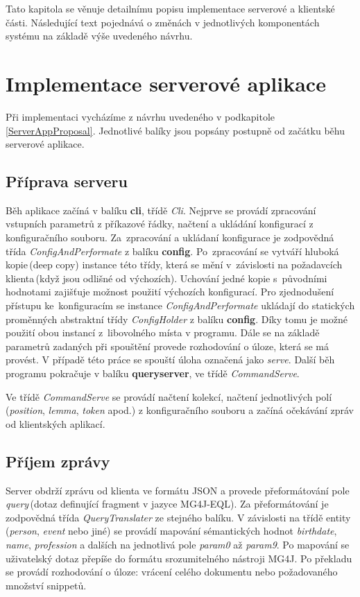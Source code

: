 Tato kapitola se věnuje detailnímu popisu implementace serverové a klientské části. Následující text pojednává o  změnách v jednotlivých komponentách systému na základě výše uvedeného návrhu.   


\section{Implementace serverové aplikace}
\label{serverSideImplem}
Při implementaci vycházíme z návrhu uvedeného v podkapitole \ref{ServerAppProposal}. Jednotlivé balíky jsou popsány postupně od začátku běhu serverové aplikace. 

\subsection*{Příprava serveru}

Běh aplikace začíná v balíku \textbf{cli}, třídě \emph{Cli}. Nejprve se provádí zpracování vstupních parametrů z příkazové řádky, načtení a ukládání konfigurací z konfiguračního souboru. Za~zpracování a ukládaní konfigurace je zodpovědná třída \emph{ConfigAndPerformate} z balíku  \textbf{config}. Po~zpracování se vytváří hluboká kopie\,(deep copy) instance této třídy, která se mění v~závislosti na požadavcích klienta\,(když jsou odlišné od výchozích). Uchování jedné kopie s~původními hodnotami zajišťuje možnost použití výchozích konfigurací. Pro zjednodušení přístupu ke~konfiguracím se instance \emph{ConfigAndPerformate} ukládají do statických proměnných abstraktní třídy \emph{ConfigHolder} z balíku \textbf{config}. Díky tomu je možné použití obou instancí z~libovolného místa v programu. Dále se na základě parametrů zadaných při spouštění provede rozhodování o úloze, která se má provést. V případě této práce se spouští úloha označená jako \emph{serve}. Další běh programu pokračuje v balíku \textbf{queryserver}, ve třídě \emph{CommandServe}.

Ve třídě \emph{CommandServe} se provádí načtení kolekcí, načtení jednotlivých polí\,(\emph{position}, \emph{lemma}, \emph{token} apod.) z konfiguračního souboru a začíná očekávání zpráv od klientských aplikací.

\subsection*{Příjem zprávy}
Server obdrží zprávu od klienta ve formátu JSON a provede přeformátování pole \emph{query}\,(dotaz definující fragment v jazyce MG4J-EQL). Za přeformátování je zodpovědná třída \emph{QueryTranslater} ze stejného balíku. V závislosti na třídě entity\,(\emph{person}, \emph{event} nebo jiné) se provádí mapování sémantických hodnot \emph{birthdate}, \emph{name}, \emph{profession} a dalších na jednotlivá pole \emph{param0} až \emph{param9}. Po mapování se uživatelský dotaz přepíše do formátu srozumitelného nástroji MG4J. Po překladu se provádí rozhodování o úloze: vrácení celého dokumentu nebo požadovaného množství snippetů. 

